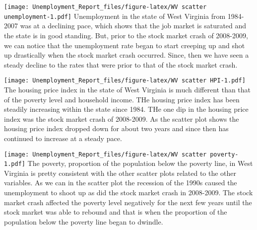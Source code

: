 \documentclass[
]{article}
\newenvironment{Shaded}{\begin{snugshade}}{\end{snugshade}}
\newcommand{\DataTypeTok}[1]{\textcolor[rgb]{0.13,0.29,0.53}{#1}}
\newcommand{\DecValTok}[1]{\textcolor[rgb]{0.00,0.00,0.81}{#1}}
\newcommand{\KeywordTok}[1]{\textcolor[rgb]{0.13,0.29,0.53}{\textbf{#1}}}
\newcommand{\NormalTok}[1]{#1}
\newcommand{\OperatorTok}[1]{\textcolor[rgb]{0.81,0.36,0.00}{\textbf{#1}}}
\newcommand{\StringTok}[1]{\textcolor[rgb]{0.31,0.60,0.02}{#1}}
\begin{document}
\texttt{[image: Unemployment\_Report\_files/figure-latex/WV scatter unemployment-1.pdf]}
Unemployment in the state of West Virginia from 1984-2007 was at a
declining pace, which shows that the job market is saturated and the
state is in good standing. But, prior to the stock market crash of
2008-2009, we can notice that the unemployment rate began to start
creeping up and shot up drastically when the stock market crash
occurred. Since, then we have seen a steady decline to the rates that
were prior to that of the stock market crash.

\begin{Shaded}
\end{Shaded}

\texttt{[image: Unemployment\_Report\_files/figure-latex/WV scatter HPI-1.pdf]}
The housing price index in the state of West Virginia is much different
than that of the poverty level and household income. THe housing price
index has been steadily increasing within the state since 1984. THe one
dip in the housing price index was the stock market crash of 2008-2009.
As the scatter plot shows the housing price index dropped down for about
two years and since then has continued to increase at a steady pace.

\begin{Shaded}
\end{Shaded}

\texttt{[image: Unemployment\_Report\_files/figure-latex/WV scatter poverty-1.pdf]}
The poverty, proportion of the population below the poverty line, in
West Virginia is pretty consistent with the other scatter plots related
to the other variables. As we can in the scatter plot the recession of
the 1990s caused the unemployment to shoot up as did the stock market
crash in 2008-2009. The stock market crash affected the poverty level
negatively for the next few years until the stock market was able to
rebound and that is when the proportion of the population below the
poverty line began to dwindle.
\end{document}
